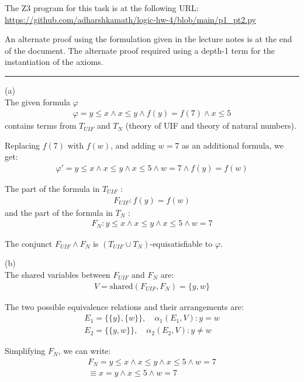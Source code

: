 \documentclass[12pt,letterpaper, onecolumn]{exam}
\newcommand{\link}[1]{{\color{blue}\href{#1}{#1}}}
\begin{document}
\begin{questions}
	The Z3 program for this task is at the following URL: 
	\link{https://github.com/adharshkamath/logic-hw-4/blob/main/p1\_pt2.py}

	An alternate proof using the formulation given in the lecture notes is at the end of the document.
	The alternate proof required using a depth-1 term for the instantiation of the axioms.

    {\rule{17cm}{0.4pt}}

	\question[]
	\solutiontitle

	(a) \\
	The given formula $ \varphi $
	\begin{align*}
		\varphi = y \le x \land x \le y \land f(y) = f(7) \land x \le 5
	\end{align*}
	contains terms from $ T_{UIF} $ and $ T_{N} $ (theory of UIF and theory of natural numbers).

	Replacing $ f(7) $ with $ f(w) $, and adding $ w= 7 $ as an additional formula, we get:
	\begin{align*}
		\varphi' = y \le x \land x \le y \land x \le 5 \land w = 7 \land f(y) = f(w) 
	\end{align*} 

	The part of the formula in $ T_{UIF} $ :
	\begin{align*}
		F_{UIF} : f(y) = f(w)
	\end{align*}
	and the part of the formula in $ T_{N} $ :
	\begin{align*}
		F_{N} : y \le x \land x \le y \land x \le 5 \land w = 7
	\end{align*}

	The conjunct $ F_{UIF} \land F_{N} $ is $(T_{UIF} \cup T_N)$-equisatisfiable to $ \varphi $.

	(b) \\
	The shared variables between $ F_{UIF} $ and $ F_{N} $ are:
	\begin{align*}
		V = \text{shared}(F_{UIF}, F_{N}) = \{y, w\}
	\end{align*}

	The two possible equivalence relations and their arrangements are:
	\begin{align*}
		E_1 = \{\{y\}, \{w\}\}, \quad \alpha_1(E_1, V) : y = w\\
		E_2 = \{\{y, w\}\}, \quad \alpha_2(E_2, V) : y \neq w
	\end{align*}

	Simplifying $F_N$, we can write:
	\begin{align*}
		F_N = y \le x \land x \le y \land x \le 5 \land w = 7 \\
			\equiv x = y \land x \le 5 \land w = 7
	\end{align*}


\end{questions}
\end{document}
